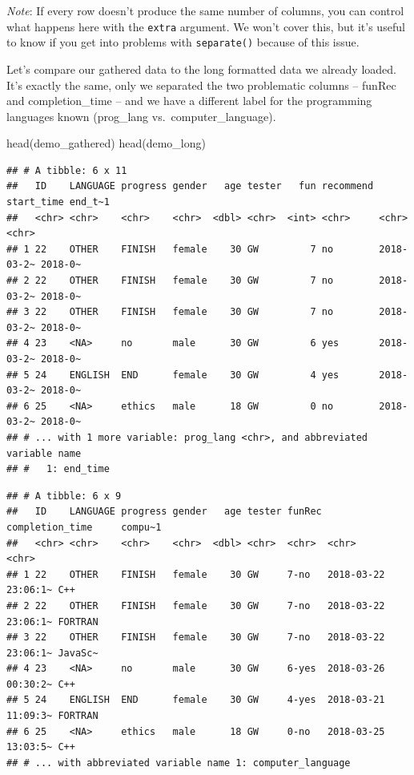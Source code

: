 \documentclass[
]{book}
\newenvironment{Shaded}{\begin{snugshade}}{\end{snugshade}}
\newcommand{\FunctionTok}[1]{\textcolor[rgb]{0.00,0.00,0.00}{#1}}
\newcommand{\NormalTok}[1]{#1}
\begin{document}
\emph{Note}: If every row doesn't produce the same number of columns, you can control what happens here with the \texttt{extra} argument. We won't cover this, but it's useful to know if you get into problems with \texttt{separate()} because of this issue.

Let's compare our gathered data to the long formatted data we already loaded. It's exactly the same, only we separated the two problematic columns -- funRec and completion\_time -- and we have a different label for the programming languages known (prog\_lang vs.~computer\_language).

\begin{Shaded}
\begin{Highlighting}[]
\FunctionTok{head}\NormalTok{(demo\_gathered)}
\FunctionTok{head}\NormalTok{(demo\_long)}
\end{Highlighting}
\end{Shaded}

\begin{verbatim}
## # A tibble: 6 x 11
##   ID    LANGUAGE progress gender   age tester   fun recommend start_time end_t~1
##   <chr> <chr>    <chr>    <chr>  <dbl> <chr>  <int> <chr>     <chr>      <chr>  
## 1 22    OTHER    FINISH   female    30 GW         7 no        2018-03-2~ 2018-0~
## 2 22    OTHER    FINISH   female    30 GW         7 no        2018-03-2~ 2018-0~
## 3 22    OTHER    FINISH   female    30 GW         7 no        2018-03-2~ 2018-0~
## 4 23    <NA>     no       male      30 GW         6 yes       2018-03-2~ 2018-0~
## 5 24    ENGLISH  END      female    30 GW         4 yes       2018-03-2~ 2018-0~
## 6 25    <NA>     ethics   male      18 GW         0 no        2018-03-2~ 2018-0~
## # ... with 1 more variable: prog_lang <chr>, and abbreviated variable name
## #   1: end_time
\end{verbatim}

\begin{verbatim}
## # A tibble: 6 x 9
##   ID    LANGUAGE progress gender   age tester funRec completion_time     compu~1
##   <chr> <chr>    <chr>    <chr>  <dbl> <chr>  <chr>  <chr>               <chr>  
## 1 22    OTHER    FINISH   female    30 GW     7-no   2018-03-22 23:06:1~ C++    
## 2 22    OTHER    FINISH   female    30 GW     7-no   2018-03-22 23:06:1~ FORTRAN
## 3 22    OTHER    FINISH   female    30 GW     7-no   2018-03-22 23:06:1~ JavaSc~
## 4 23    <NA>     no       male      30 GW     6-yes  2018-03-26 00:30:2~ C++    
## 5 24    ENGLISH  END      female    30 GW     4-yes  2018-03-21 11:09:3~ FORTRAN
## 6 25    <NA>     ethics   male      18 GW     0-no   2018-03-25 13:03:5~ C++    
## # ... with abbreviated variable name 1: computer_language
\end{verbatim}
\end{document}
